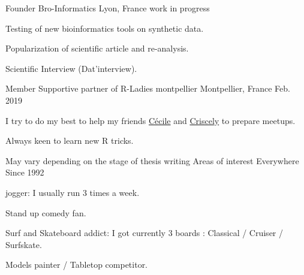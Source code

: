 

\begin{cventries}

  \cventry
    {Founder} %
    {Bro-Informatics} %
    {Lyon, France} %
    {work in progress} %
    {
      \begin{cvitems} %
        \item {Testing of new bioinformatics tools on synthetic data.}
        \item {Popularization of scientific article and re-analysis.}
        \item {Scientific Interview (Dat'interview).}
      \end{cvitems}
    }

  \cventry
    {Member} %
    {Supportive partner of R-Ladies montpellier} %
    {Montpellier, France} %
    {Feb. 2019} %
    {
      \begin{cvitems} %
        \item {I try to do my best to help my friends \href{https://github.com/cecilesauder}{Cécile} and \href{https://github.com/CriscelyLP}{Criscely} to prepare meetups.}
        \item {Always keen to learn new R tricks.}
      \end{cvitems}
    }
    
  \cventry
    {May vary depending on the stage of thesis writing} %
    {Areas of interest} %
    {Everywhere} %
    {Since 1992} %
    {
      \begin{cvitems} %
        \item {jogger: I usually run 3 times a week.}
        \item {Stand up comedy fan.}
        \item {Surf and Skateboard addict: I got currently 3 boards : Classical / Cruiser / Surfskate.}
        \item {Models painter / Tabletop competitor.}
      \end{cvitems}
    }

\end{cventries}
